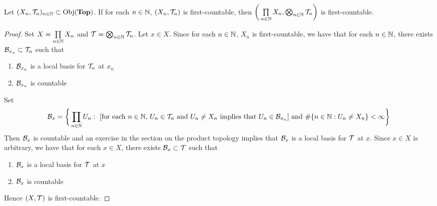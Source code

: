 \documentclass{book}
\begin{document}
	
	\begin{ex}
		Let $(X_n, \mathcal{T}_n)_{n \in \mathbb{N}} \subset \operatorname{Obj}(\operatorname*{\text{\textbf{Top}}})$. If for each $n \in \mathbb{N}$, $(X_n, \mathcal{T}_n)$ is first-countable, then $\bigg( \prod\limits_{n \in \mathbb{N}} X_n, \bigotimes_{n \in \mathbb{N}} \mathcal{T}_n \bigg)$ is first-countable. 
	\end{ex}

	\begin{proof}
		Set $X = \prod\limits_{n \in \mathbb{N}} X_n$ and $\mathcal{T} = \bigotimes_{n \in \mathbb{N}} \mathcal{T}_n$. Let $x \in X$. Since for each $n \in \mathbb{N}$, $X_n$ is first-countable, we have that for each $n \in \mathbb{N}$, there exists $\mathcal{B}_{x_n} \subset \mathcal{T}_n$ such that  
		\begin{enumerate}
			\item $\mathcal{B}_{x_n}$ is a local basis for $\mathcal{T}_n$ at $x_n$
			\item $\mathcal{B}_{x_n}$ is countable
		\end{enumerate}
		Set 
		$$\mathcal{B}_x = \bigg \{\prod_{n \in \mathbb{N}} U_n: \text{ [for each $n \in \mathbb{N}$, $U_n \in \mathcal{T}_n$ and $U_n \neq X_n$ implies that $U_n \in \mathcal{B}_{x_n}$] and $\# \{n \in \mathbb{N}: U_n \neq X_n\} < \infty$} \bigg\}$$
		Then $\mathcal{B}_x$ is countable and an exercise in the section on the product topology implies that $\mathcal{B}_x$ is a local basis for $\mathcal{T}$ at $x$. Since $x \in X$ is arbitrary, we have that for each $x \in X$, there exists $\mathcal{B}_x \subset \mathcal{T}$ such that 
		\begin{enumerate}
			\item $\mathcal{B}_x$ is a local basis for $\mathcal{T}$ at $x$
			\item $\mathcal{B}_x$ is countable
		\end{enumerate}
		Hence $(X, \mathcal{T})$ is first-countable.
	\end{proof}
	
	
	
	
	
	
	
	
	
	
	
	
	
	
	
	
	
	
	
	
	
	
	
	
	
	
	
	
	
	
	
	
	
	
	
	
	
	
	
\end{document}
